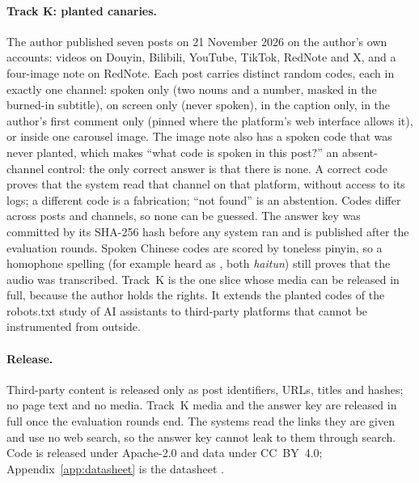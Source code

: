 \paragraph{Track K: planted canaries.}
The author published seven posts on 21 November 2026 on the author's own accounts: videos on Douyin, Bilibili,
YouTube, TikTok, RedNote and X, and a four-image note on RedNote. Each post carries distinct random codes, each
in exactly one channel: spoken only (two nouns and a number, masked in the burned-in subtitle), on screen only
(never spoken), in the caption only, in the author's first comment only (pinned where the platform's web
interface allows it), or inside one carousel image. The image note also has a spoken code that was never planted,
which makes ``what code is spoken in this post?'' an absent-channel control: the only correct answer is that
there is none. A correct code proves that the system read that channel on that platform, without access to its
logs; a different code is a fabrication; ``not found'' is an abstention. Codes differ across posts and channels,
so none can be guessed. The answer key was committed by its SHA-256 hash before any system ran and is published
after the evaluation rounds. Spoken Chinese codes are scored by toneless pinyin, so a homophone spelling
(for example  heard as , both \emph{haitun}) still proves that the audio was transcribed. Track~K is the one slice whose media
can be released in full, because the author holds the rights. It extends the planted codes of the robots.txt
study of AI assistants \citep{lopezfonseca2026robots} to third-party platforms that cannot be instrumented from
outside.

\paragraph{Release.}
Third-party content is released only as post identifiers, URLs, titles and hashes; no page text and no media.
Track~K media and the answer key are released in full once the evaluation rounds end. The systems read the links they are
given and use no web search, so the answer key cannot leak to them through search. Code is released under
Apache-2.0 and data under CC~BY~4.0; Appendix~\ref{app:datasheet} is the datasheet \citep{gebru2021datasheets}.
